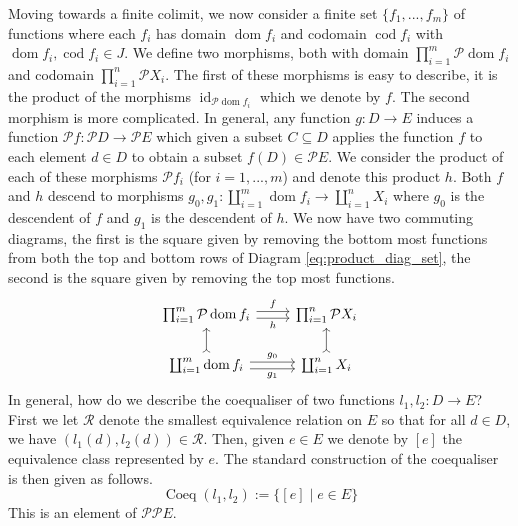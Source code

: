 \documentclass{birkjour}
\theoremstyle{plain}
\theoremstyle{definition}
\newcommand{\call}[1]{\mathcal{#1}}
\newcommand{\lto}{\longrightarrow}
\begin{document}
	Moving towards a finite colimit, we now consider a finite set $\lbrace f_1,...,f_m\rbrace$ of functions where each $f_i$ has domain $\operatorname{dom}f_i$ and codomain $\operatorname{cod}f_i$ with $\operatorname{dom}f_i, \operatorname{cod}f_i \in J$. We define two morphisms, both with domain $\prod_{i = 1}^m \call{P}\operatorname{dom}f_i$ and codomain $\prod_{i = 1}^n \call{P}X_i$. The first of these morphisms is easy to describe, it is the product of the morphisms $\operatorname{id}_{\call{P}\operatorname{dom}f_i}$ which we denote by $f$. The second morphism is more complicated. In general, any function $g: D \lto E$ induces a function $\call{P}f: \call{P}D \lto \call{P}E$ which given a subset $C \subseteq D$ applies the function $f$ to each element $d \in D$ to obtain a subset $f(D) \in \call{P}E$. We consider the product of each of these morphisms $\call{P} f_i$ (for $i = 1,...,m$) and denote this product $h$.  Both $f$ and $h$ descend to morphisms $g_0,g_1: \coprod_{i = 1}^m \operatorname{dom}f_i\lto \coprod_{i = 1}^n X_i$ where $g_0$ is the descendent of $f$ and $g_1$ is the descendent of $h$. We now have two commuting diagrams, the first is the square given by removing the bottom most functions from both the top and bottom rows of Diagram \ref{eq:product_diag_set}, the second is the square given by removing the top most functions.
	\begin{equation}\label{eq:product_diag_set}
		\begin{tikzcd}
			\prod_{i = 1}^m \call{P}\operatorname{dom}f_i\arrow[r,shift left, "{f}"]\arrow[r,shift right, swap, "{h}"] & \prod_{i  =1}^n \call{P} X_i\\
			\coprod_{i = 1}^m \operatorname{dom}f_i\arrow[r,shift left, "{g_0}"]\arrow[r,shift right, swap, "{g_1}"]\arrow[u,rightarrowtail] & \coprod_{i = 1}^n X_i\arrow[u,rightarrowtail]
		\end{tikzcd}
	\end{equation}
	In general, how do we describe the coequaliser of two functions $l_1,l_2: D \lto E$? First we let $\call{R}$ denote the smallest equivalence relation on $E$ so that for all $d \in D$, we have $(l_1(d),l_2(d)) \in \call{R}$. Then, given $e \in E$ we denote by $[e]$ the equivalence class represented by $e$. The standard construction of the coequaliser is then given as follows.
	\begin{equation}
		\operatorname{Coeq}(l_1,l_2) := \lbrace [e] \mid e \in E\rbrace
	\end{equation}
	This is an element of $\call{P}\call{P}E$.
	
\end{document}
